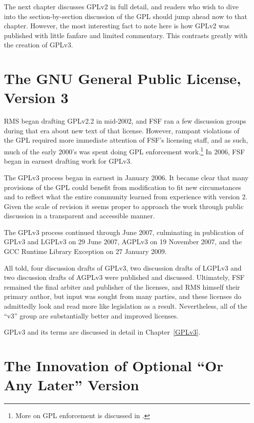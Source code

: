 The next chapter discusses GPLv2 in full detail, and readers who wish to dive
into the section-by-section discussion of the GPL should jump ahead now to
that chapter.  However, the most interesting fact to note here is how GPLv2
was published with little fanfare and limited commentary.  This contrasts
greatly with the creation of GPLv3.

\section{The GNU General Public License, Version 3}

RMS began drafting GPLv2.2 in mid-2002, and FSF ran a few discussion groups
during that era about new text of that license.  However, rampant violations
of the GPL required more immediate attention of FSF's licensing staff, and as
such, much of the early 2000's was spent doing GPL enforcement
work.\footnote{More on GPL enforcement is discussed in .}  In
2006, FSF began in earnest drafting work for GPLv3.

The GPLv3 process began in earnest in January 2006.  It became clear that
many provisions of the GPL could benefit from modification to fit new
circumstances and to reflect what the entire community learned from
experience with version 2.  Given the scale of revision it seems proper to
approach the work through public discussion in a transparent and accessible
manner.

The GPLv3 process continued through June 2007, culminating in publication of
GPLv3 and LGPLv3 on 29 June 2007, AGPLv3 on 19 November 2007, and the GCC
Runtime Library Exception on 27 January 2009.

All told, four discussion drafts of GPLv3, two discussion drafts of LGPLv3
and two discussion drafts of AGPLv3 were published and discussed.
Ultimately, FSF remained the final arbiter and publisher of the licenses, and
RMS himself their primary author, but input was sought from many parties, and
these licenses do admittedly look and read more like legislation as a result.
Nevertheless, all of the ``v3'' group are substantially better and improved
licenses.

GPLv3 and its terms are discussed in detail in Chapter~\ref{GPLv3}.

\section{The Innovation of Optional ``Or Any Later'' Version}

